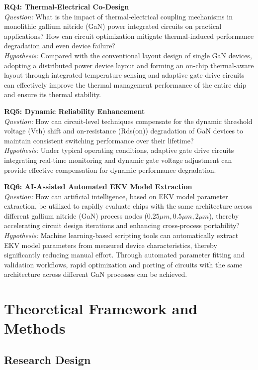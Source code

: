 \documentclass[12pt,a4paper]{article}
\begin{document}
\textbf{RQ4: Thermal-Electrical Co-Design}\\
\textit{Question:} What is the impact of thermal-electrical coupling mechanisms in monolithic gallium nitride (GaN) power integrated circuits on practical applications? How can circuit optimization mitigate thermal-induced performance degradation and even device failure?\\
\textit{Hypothesis:} Compared with the conventional layout design of single GaN devices, adopting a distributed power device layout and forming an on-chip thermal-aware layout through integrated temperature sensing and adaptive gate drive circuits can effectively improve the thermal management performance of the entire chip and ensure its thermal stability.

\textbf{RQ5: Dynamic Reliability Enhancement}\\
\textit{Question:} How can circuit-level techniques compensate for the dynamic threshold voltage (Vth) shift and on-resistance (Rds(on)) degradation of GaN devices to maintain consistent switching performance over their lifetime?\\
\textit{Hypothesis:} Under typical operating conditions, adaptive gate drive circuits integrating real-time monitoring and dynamic gate voltage adjustment can provide effective compensation for dynamic performance degradation.

\textbf{RQ6: AI-Assisted Automated EKV Model Extraction}\\
\textit{Question:} How can artificial intelligence, based on EKV model parameter extraction, be utilized to rapidly evaluate chips with the same architecture across different gallium nitride (GaN) process nodes ($0.25 \mu m, 0.5 \mu m, 2 \mu m$), thereby accelerating circuit design iterations and enhancing cross-process portability?\\
\textit{Hypothesis:} Machine learning-based scripting tools can automatically extract EKV model parameters from measured device characteristics, thereby significantly reducing manual effort. Through automated parameter fitting and validation workflows, rapid optimization and porting of circuits with the same architecture across different GaN processes can be achieved.

\section{Theoretical Framework and Methods}

\subsection{Research Design}
\end{document}
